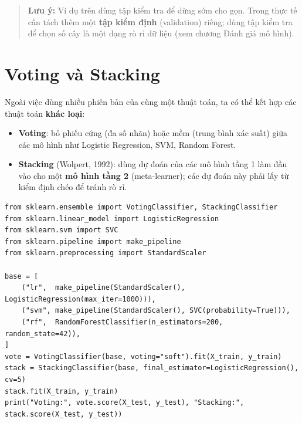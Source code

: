 \begin{quote}
\textbf{Lưu ý:} Ví dụ trên dùng tập kiểm tra để dừng sớm cho gọn. Trong thực tế cần tách thêm một \textbf{tập kiểm định} (validation) riêng; dùng tập kiểm tra để chọn số cây là một dạng rò rỉ dữ liệu (xem chương Đánh giá mô hình).
\end{quote}


\section{Voting và Stacking}

Ngoài việc dùng nhiều phiên bản của cùng một thuật toán, ta có thể kết hợp các thuật toán \textbf{khác loại}:
\begin{itemize}
    \item \textbf{Voting}: bỏ phiếu cứng (đa số nhãn) hoặc mềm (trung bình xác suất) giữa các mô hình như Logistic Regression, SVM, Random Forest.
    \item \textbf{Stacking} (Wolpert, 1992): dùng dự đoán của các mô hình tầng 1 làm đầu vào cho một \textbf{mô hình tầng 2} (meta-learner); các dự đoán này phải lấy từ kiểm định chéo để tránh rò rỉ.
\end{itemize}

\begin{lstlisting}[caption={Voting và Stacking}]
from sklearn.ensemble import VotingClassifier, StackingClassifier
from sklearn.linear_model import LogisticRegression
from sklearn.svm import SVC
from sklearn.pipeline import make_pipeline
from sklearn.preprocessing import StandardScaler

base = [
    ("lr",  make_pipeline(StandardScaler(), LogisticRegression(max_iter=1000))),
    ("svm", make_pipeline(StandardScaler(), SVC(probability=True))),
    ("rf",  RandomForestClassifier(n_estimators=200, random_state=42)),
]
vote = VotingClassifier(base, voting="soft").fit(X_train, y_train)
stack = StackingClassifier(base, final_estimator=LogisticRegression(), cv=5)
stack.fit(X_train, y_train)
print("Voting:", vote.score(X_test, y_test), "Stacking:", stack.score(X_test, y_test))
\end{lstlisting}

